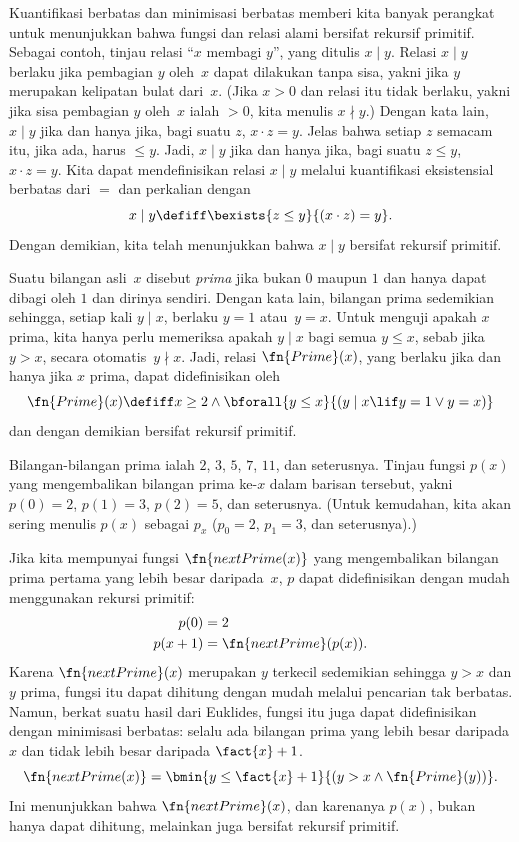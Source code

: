 \documentclass[../../../include/open-logic-section]{subfiles}
\begin{document}

Kuantifikasi berbatas dan minimisasi berbatas memberi kita banyak perangkat
untuk menunjukkan bahwa fungsi dan relasi alami bersifat rekursif primitif.
Sebagai contoh, tinjau relasi ``$x$ membagi $y$'', yang ditulis $x \mid y$.
Relasi $x \mid y$ berlaku jika pembagian $y$ oleh~$x$ dapat dilakukan tanpa
sisa, yakni jika $y$ merupakan kelipatan bulat dari~$x$. (Jika $x>0$ dan relasi
itu tidak berlaku, yakni jika sisa pembagian $y$ oleh~$x$ ialah $>0$, kita menulis
$x \nmid y$.) Dengan kata lain, $x \mid y$ jika dan hanya jika, bagi suatu
$z$, $x \cdot z = y$. Jelas bahwa setiap $z$ semacam itu, jika ada, harus
$\leq y$. Jadi, $x \mid y$ jika dan hanya jika, bagi suatu $z \le y$,
$x \cdot z = y$. Kita dapat mendefinisikan relasi $x \mid y$ melalui
kuantifikasi eksistensial berbatas dari $=$ dan perkalian dengan
\[
x \mid y \defiff \bexists{z \leq y}{(x \cdot z) = y}.
\]
Dengan demikian, kita telah menunjukkan bahwa $x \mid y$ bersifat rekursif
primitif.

Suatu bilangan asli~$x$ disebut \emph{prima} jika bukan $0$ maupun $1$ dan
hanya dapat dibagi oleh $1$ dan dirinya sendiri. Dengan kata lain, bilangan
prima sedemikian sehingga, setiap kali $y \mid x$, berlaku $y=1$ atau~$y=x$.
Untuk menguji apakah $x$ prima, kita hanya perlu memeriksa apakah $y \mid x$
bagi semua $y \le x$, sebab jika $y>x$, secara otomatis~$y \nmid x$. Jadi,
relasi $\fn{Prime}(x)$, yang berlaku jika dan hanya jika $x$ prima, dapat
didefinisikan oleh
\[
\fn{Prime}(x) \defiff x \geq 2 \land \bforall{y \leq x}{(y \mid x \lif y
  = 1 \lor y = x)}
\]
dan dengan demikian bersifat rekursif primitif.

Bilangan-bilangan prima ialah $2$, $3$, $5$, $7$, $11$, dan seterusnya.
Tinjau fungsi $p(x)$ yang mengembalikan bilangan prima ke-$x$ dalam barisan
tersebut, yakni $p(0)=2$, $p(1)=3$, $p(2)=5$, dan seterusnya. (Untuk
kemudahan, kita akan sering menulis $p(x)$ sebagai $p_x$ ($p_0=2$, $p_1=3$,
dan seterusnya).)

Jika kita mempunyai fungsi $\fn{nextPrime(x)}$ yang mengembalikan bilangan
prima pertama yang lebih besar daripada~$x$, $p$ dapat didefinisikan dengan
mudah menggunakan rekursi primitif:
\begin{align*}
  p(0) & = 2\\
  p(x+1) & = \fn{nextPrime}(p(x)).
\end{align*}
Karena $\fn{nextPrime}(x)$ merupakan $y$ terkecil sedemikian sehingga $y>x$
dan $y$ prima, fungsi itu dapat dihitung dengan mudah melalui pencarian tak
berbatas. Namun, berkat suatu hasil dari Euklides, fungsi itu juga dapat
didefinisikan dengan minimisasi berbatas: selalu ada bilangan prima yang lebih
besar daripada $x$ dan tidak lebih besar daripada $\fact{x}+1$.
\[
  \fn{nextPrime(x)} =
  \bmin{y \leq \fact{x}+1}{(y > x \land \fn{Prime}(y))}.
\]
Ini menunjukkan bahwa $\fn{nextPrime}(x)$, dan karenanya $p(x)$, bukan hanya
dapat dihitung, melainkan juga bersifat rekursif primitif.
\end{document}
